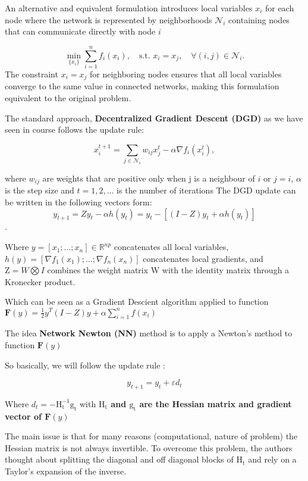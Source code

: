 \documentclass[10pt,english]{article}
\begin{document}
An alternative and equivalent formulation introduces local variables $x_i$ for each node where the network is represented by neighborhoods $\mathcal{N}_i$ containing nodes that can communicate directly with node $i$

\begin{equation}
\min_{\{x_i\}} \sum_{i=1}^{n} f_i(x_i), \quad \text{s.t. } x_i = x_j, \quad \forall (i,j) \in \mathcal{N}_i.
\end{equation}
The constraint $x_i = x_j$ for neighboring nodes ensures that all local variables converge to the same value in connected networks, making this formulation equivalent to the original problem.

The standard approach, \textbf{Decentralized Gradient Descent (DGD)} as we have seen in course follows the update rule:

\begin{equation}
x_i^{t+1} = \sum_{j \in \mathcal{N}_i} w_{ij} x_j^t - \alpha \nabla f_i(x_i^t),
\end{equation}

where $w_{ij}$ are weights that are positive only when j is a neighbour of $i$ or $j=i$, $\alpha$ is the step size and $t = 1,2, \dots $ is the number of iterations
The DGD update can be written in the following vectors form:
$$y_{t+1} = Zy_t - \alpha h(y_t) = y_t - [(I-Z)y_t + \alpha h(y_t)]$$. 


Where $y = [x_1; ...; x_n] \in \mathbb{R}^{np}$ concatenates all local variables, $h(y) = [\nabla f_1(x_1); ...; \nabla f_n(x_n)]$ concatenates local gradients, and $\mathrm{Z} = W \bigotimes I$ combines the weight matrix W with the identity matrix through a Kronecker product.


Which can be seen as a Gradient Descient algorithm applied to function $\textbf{F}(y) = \frac{1}{2} y^T(I-Z)y + \alpha \sum_{i=1}^n f(x_i)$

The  idea \textbf{Network Newton (NN)} method is to apply a Newton's method to function $\textbf{F}(y)$

So basically, we will follow the update rule : 

$$
y_{t+1} = y_{t} + \varepsilon d_t
$$

Where $d_t = -\mathrm{H_t^{-1} g_t}$ with\textbf{ $\mathrm{H_t}$ and $\mathrm{g_t}$ are the Hessian matrix and gradient vector of $\textbf{F}(y)$}


The main issue is that for many reasons (computational, nature of problem) the Hessian matrix is not always invertible. To overcome this problem, the authors thought about splitting the diagonal and off diagonal blocks of $\mathrm{H_t}$ and rely on a Taylor's expansion of the inverse.
\end{document}

